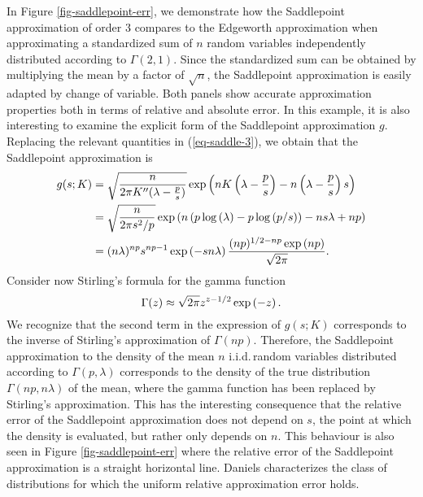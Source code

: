 \begin{example}
    In Figure \ref{fig-saddlepoint-err}, we demonstrate how the Saddlepoint approximation of order 3 compares to the Edgeworth approximation when approximating a standardized sum of $n$ random variables independently distributed according to $\Gamma(2, 1)$. Since the standardized sum can be obtained by multiplying the mean by a factor of $\sqrt{n}$, the Saddlepoint approximation is easily adapted by change of variable. Both panels show accurate approximation properties both in terms of relative and absolute error.
    \newline
    In this example, it is also interesting to examine the explicit form of the Saddlepoint approximation $g$. Replacing the relevant quantities in (\ref{eq-saddle-3}), we obtain that the Saddlepoint approximation is
    \begin{align*}
        g(s; K) &= \sqrt{\frac{n}{2\pi K''(\lambda - \frac{p}{s})}} \exp\left(nK\left(\lambda - \frac{p}{s}\right) - n\left(\lambda - \frac{p}{s}\right)s\right)\\
        &= \sqrt{\frac{n}{2\pi s^2/p}} \exp\left(n\left(p\log\left(\lambda\right) - p\log\left(p/s\right)\right) - ns\lambda + np\right)\\
        &= (n\lambda)^{np}s^{np-1}\exp\left(-sn\lambda\right)  \frac{(np)^{1/2-np}\exp\left(np\right)}{\sqrt{2\pi}}.
    \end{align*}
    Consider now Stirling's formula for the gamma function
    \begin{equation*}
        \Gamma(z) \approx \sqrt{2\pi}z^{z-1/2}\exp\left(-z\right).
    \end{equation*}
    We recognize that the second term in the expression of $g(s; K)$ corresponds to the inverse of Stirling's approximation of $\Gamma(np)$. Therefore, the Saddlepoint approximation to the density of the mean $n$ i.i.d.\,random variables distributed according to $\Gamma(p, \lambda)$ corresponds to the density of the true distribution $\Gamma(np, n\lambda)$ of the mean, where the gamma function has been replaced by Stirling's approximation. This has the interesting consequence that the relative error of the Saddlepoint approximation does not depend on $s$, the point at which the density is evaluated, but rather only depends on $n$. This behaviour is also seen in Figure \ref{fig-saddlepoint-err} where the relative error of the Saddlepoint approximation is a straight horizontal line. Daniels \cite{daniels1954saddlepoint} characterizes the class of distributions for which the uniform relative approximation error holds.

  
    
\end{example}